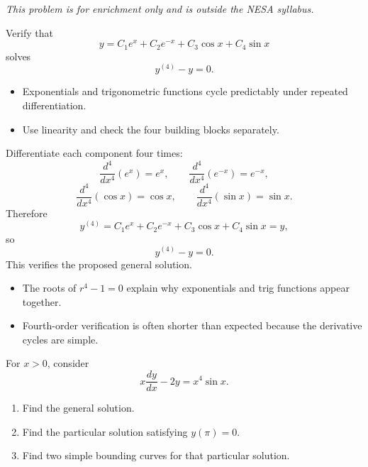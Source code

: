 \begin{problem}
\textit{This problem is for enrichment only and is outside the NESA syllabus.}

Verify that
\[
y=C_1e^x+C_2e^{-x}+C_3\cos x+C_4\sin x
\]
solves
\[
y^{(4)}-y=0.
\]
\end{problem}

\begin{hint}
\begin{itemize}[leftmargin=*]
    \item Exponentials and trigonometric functions cycle predictably under repeated differentiation.
    \item Use linearity and check the four building blocks separately.
\end{itemize}
\end{hint}

\begin{solution}
Differentiate each component four times:
\[
\frac{d^4}{dx^4}(e^x)=e^x,\qquad
\frac{d^4}{dx^4}(e^{-x})=e^{-x},
\]
\[
\frac{d^4}{dx^4}(\cos x)=\cos x,\qquad
\frac{d^4}{dx^4}(\sin x)=\sin x.
\]
Therefore
\[
y^{(4)}=C_1e^x+C_2e^{-x}+C_3\cos x+C_4\sin x=y,
\]
so
\[
\boxed{y^{(4)}-y=0.}
\]
This verifies the proposed general solution.
\end{solution}

\begin{takeaways}
\begin{itemize}[leftmargin=*]
    \item The roots of $r^4-1=0$ explain why exponentials and trig functions appear together.
    \item Fourth-order verification is often shorter than expected because the derivative cycles are simple.
\end{itemize}
\end{takeaways}

\begin{problem}
For $x>0$, consider
\[
x\frac{dy}{dx}-2y=x^4\sin x.
\]
\begin{enumerate}
    \item[\textbf{i}] Find the general solution.
    \item[\textbf{ii}] Find the particular solution satisfying $y(\pi)=0$.
    \item[\textbf{iii}] Find two simple bounding curves for that particular solution.
\end{enumerate}
\end{problem}

